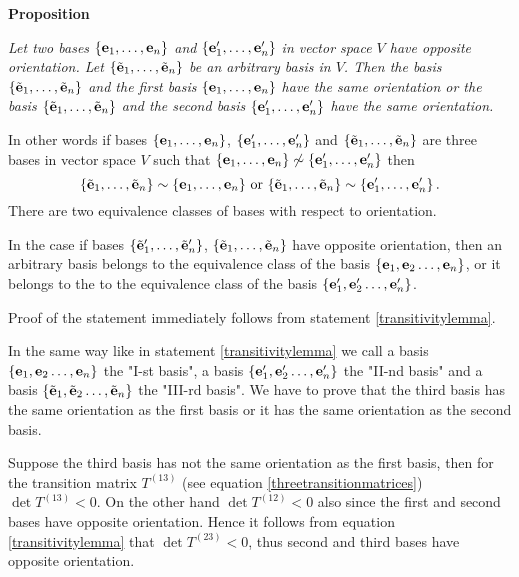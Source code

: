 \documentclass[12pt]{article}
\numberwithin{equation}{section}
\begin{document}
{\bf Proposition}   {\it Let two bases 
$\{{\bf e}_1,\dots,{\bf e}_n\}$ and
 $\{{\bf e}'_1,\dots,{\bf e}'_n\}$ in vector space $V$ 
have opposite orientation.
  Let $\{\tilde{{\bf e}}_1,\dots,\tilde{{\bf e}}_n\}$ be an 
arbitrary basis in $V$.
 Then the basis $\{\tilde{{\bf e}}_1,\dots,\tilde{{\bf e}}_n\}$ 
and the first basis
  $\{{\bf e}_1,\dots,{\bf e}_n\}$
have the same orientation or the 
basis $\{\tilde{{\bf e}}_1,\dots,\tilde{{\bf e}}_n\}$
 and the second basis $\{{\bf e}'_1,\dots,{\bf e}'_n\}$ 
have the same orientation.

  In other words
 if bases $\{{\bf e}_1,\dots,{\bf e}_n\}$, $\{{\bf e}'_1,\dots,{\bf e}'_n\}$ and
 $\{\tilde{{\bf e}}_1,\dots,\tilde{{\bf e}}_n\}$
are three bases in vector space $V$ such that
 $\{{\bf e}_1,\dots,{\bf e}_n\}\not\sim\{{\bf e}'_1,\dots,{\bf e}'_n\}$ then
             \begin{equation}\label{twoorientations}
 \{\tilde{{\bf e}}_1,\dots,\tilde{{\bf e}}_n\}\sim 
\{{\bf e}_1,\dots,{\bf e}_n\}\,\,{\rm or}\,\,
 \{\tilde{{\bf e}}_1,\dots,\tilde{{\bf e}}_n\}\sim \{{\bf e}'_1,\dots,{\bf e}'_n\}\,.
                 \end{equation}
 There are two equivalence classes of bases with 
respect to orientation.

In the case if bases
 $\{\tilde{{\bf e}}'_1,\dots,\tilde{{\bf e}}'_n\}$, 
$\{\tilde{{\bf e}}_1,\dots,\tilde{{\bf e}}_n\}$
have opposite orientation, then
an arbitrary basis belongs
to the equivalence class of the basis 
$\{{\bf e}_1,{\bf e}_2\dots,{\bf e}_n\}$,
or it belongs to the to the equivalence class of the basis
$\{{\bf e}'_1,{\bf e}'_2\dots,{\bf e}'_n\}$. 
}

Proof of the statement immediately follows from statement
 \eqref{transitivitylemma}.



   In the same way like in statement 
\eqref{transitivitylemma}   
 we call a  basis $\{{\bf e}_1,{\bf e}_2\dots,{\bf e}_n\}$ the "I-st basis",
     a  basis  $\{{\bf e}'_1,{\bf e}'_2\dots,{\bf e}'_n\}$ 
the "II-nd basis" and
    a  basis  $\{\tilde{{\bf e}}_1,\tilde{{\bf e}}_2\dots,\tilde{{\bf e}}_n\}$ 
the "III-rd basis".   We have to prove that the third basis
has the same orientation as the first basis or it has
the same orientation as the second basis. 

Suppose  the third basis has not the same orientation
as the first basis, then for the transition matrix $T^{(13)}$
(see equation \eqref{threetransitionmatrices}) 
$\det T^{(13)}<0$. On the other hand
$\det T^{(12)}<0$ also since the first and second bases have opposite orientation. Hence it follows from
equation \eqref{transitivitylemma} that 
$\det T^{(23)}<0$, thus second  and third bases have opposite
orientation. \finish

         \m
\end{document}
